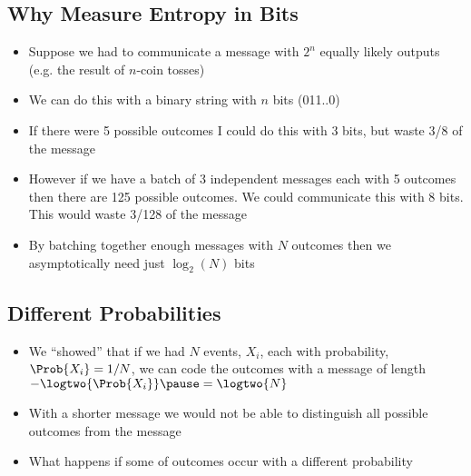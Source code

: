 \begin{slide}
\section[-2]{Why Measure Entropy in Bits}
  
\begin{PauseHighLight}
  \begin{itemize}
  \item Suppose we had to communicate a message with $2^n$ equally
    likely outputs (e.g. the result of $n$-coin tosses)\pause
  \item We can do this with a binary string with $n$ bits
    (011..0)\pause
  \item If there were 5 possible outcomes I could do this with 3 bits,
    but waste 3/8 of the message\pause
  \item However if we have a batch of 3 independent messages each with 5
    outcomes then there are 125 possible outcomes\pause.  We could communicate
    this with 8 bits.  This would waste 3/128 of the message\pauseb
  \item By batching together enough messages  with $N$ outcomes then
    we asymptotically  need just $\log_2(N)$ bits\pause
  \end{itemize}
\end{PauseHighLight}

\end{slide}


\begin{slide}
\section[-2]{Different Probabilities}

\pb
  \begin{itemize}
  \item We ``showed'' that if we had $N$ events, $X_i$, each with
    probability, $\Prob{X_i} = 1/N$, we can code the outcomes with a
    message of length $-\logtwo{\Prob{X_i}}\pause=\logtwo{N}$\pauseb
  \item With a shorter message we would not be able to distinguish all
    possible outcomes from the message\pauseh
  \item What happens if some of outcomes occur with a different probability\pauseh {}
    \begin{center}
      \pause
    \end{center}
  \end{itemize}

\end{slide}


